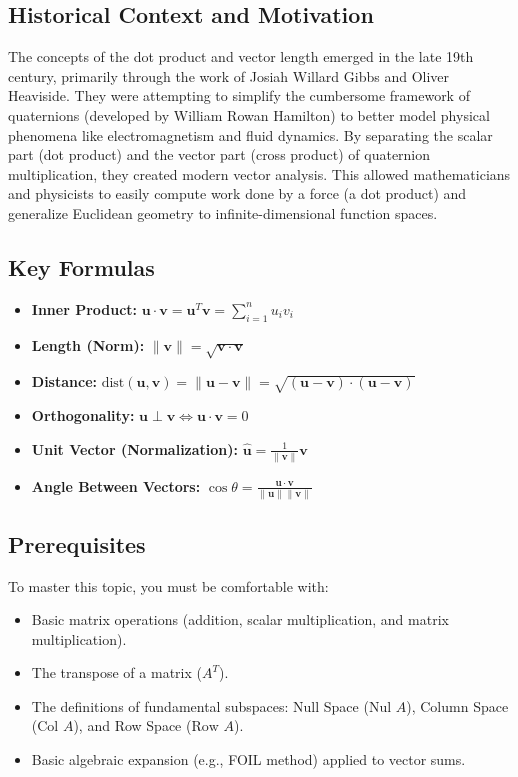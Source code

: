 \documentclass[11pt, letterpaper]{article}
\theoremstyle{definition}
\theoremstyle{remark}
\begin{document}
\subsection{Historical Context and Motivation}
The concepts of the dot product and vector length emerged in the late 19th century, primarily through the work of Josiah Willard Gibbs and Oliver Heaviside. They were attempting to simplify the cumbersome framework of quaternions (developed by William Rowan Hamilton) to better model physical phenomena like electromagnetism and fluid dynamics. By separating the scalar part (dot product) and the vector part (cross product) of quaternion multiplication, they created modern vector analysis. This allowed mathematicians and physicists to easily compute work done by a force (a dot product) and generalize Euclidean geometry to infinite-dimensional function spaces.

\subsection{Key Formulas}
\begin{itemize}
    \item \textbf{Inner Product:} $\mathbf{u} \cdot \mathbf{v} = \mathbf{u}^T \mathbf{v} = \sum_{i=1}^n u_i v_i$
    \item \textbf{Length (Norm):} $\|\mathbf{v}\| = \sqrt{\mathbf{v} \cdot \mathbf{v}}$
    \item \textbf{Distance:} $\text{dist}(\mathbf{u}, \mathbf{v}) = \|\mathbf{u} - \mathbf{v}\| = \sqrt{(\mathbf{u} - \mathbf{v}) \cdot (\mathbf{u} - \mathbf{v})}$
    \item \textbf{Orthogonality:} $\mathbf{u} \perp \mathbf{v} \iff \mathbf{u} \cdot \mathbf{v} = 0$
    \item \textbf{Unit Vector (Normalization):} $\mathbf{\hat{u}} = \frac{1}{\|\mathbf{v}\|} \mathbf{v}$
    \item \textbf{Angle Between Vectors:} $\cos \theta = \frac{\mathbf{u} \cdot \mathbf{v}}{\|\mathbf{u}\| \|\mathbf{v}\|}$
\end{itemize}

\subsection{Prerequisites}
To master this topic, you must be comfortable with:
\begin{itemize}
    \item Basic matrix operations (addition, scalar multiplication, and matrix multiplication).
    \item The transpose of a matrix ($A^T$).
    \item The definitions of fundamental subspaces: Null Space ($\text{Nul } A$), Column Space ($\text{Col } A$), and Row Space ($\text{Row } A$).
    \item Basic algebraic expansion (e.g., FOIL method) applied to vector sums.
\end{itemize}
\end{document}
